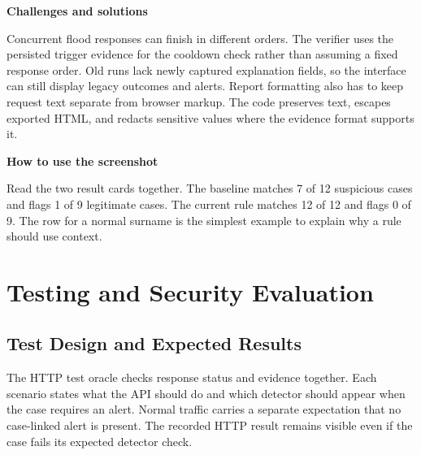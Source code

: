 \documentclass[11pt,a4paper,oneside]{report}
\newcommand{\topic}[1]{\smallskip\noindent\textbf{#1}\par\nobreak\vspace{-.39em}}
\begin{document}
\topic{Challenges and solutions}
Concurrent flood responses can finish in different orders. The verifier uses the persisted trigger evidence for the cooldown check rather than assuming a fixed response order. Old runs lack newly captured explanation fields, so the interface can still display legacy outcomes and alerts. Report formatting also has to keep request text separate from browser markup. The code preserves text, escapes exported HTML, and redacts sensitive values where the evidence format supports it.

\topic{How to use the screenshot}
Read the two result cards together. The baseline matches 7 of 12 suspicious cases and flags 1 of 9 legitimate cases. The current rule matches 12 of 12 and flags 0 of 9. The row for a normal surname is the simplest example to explain why a rule should use context.


\chapter{Testing and Security Evaluation}
\section{Test Design and Expected Results}
The HTTP test oracle checks response status and evidence together. Each scenario states what the API should do and which detector should appear when the case requires an alert. Normal traffic carries a separate expectation that no case-linked alert is present. The recorded HTTP result remains visible even if the case fails its expected detector check.
\end{document}
